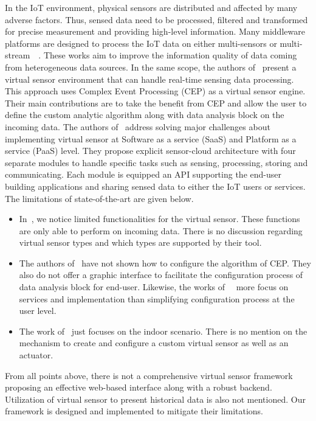 In the IoT environment, physical sensors are distributed and affected by many adverse factors. Thus, sensed data need to be processed, filtered and transformed for precise measurement and providing high-level information. Many middleware platforms are designed to process the IoT data on either multi-sensors or multi-stream~\cite{Julien2014}~\cite{LHuFWangJZhouK2015}. These works aim to improve the information quality of data coming from heterogeneous data sources. In the same scope, the authors of~\cite{BrunelliGalloBenini2016} present a virtual sensor environment that can handle real-time sensing data processing. This approach uses Complex Event Processing (CEP) as a virtual sensor engine. Their main contributions are to take the benefit from CEP and allow the user to define the custom analytic algorithm along with data analysis block on the incoming data. The authors of~\cite{GuptaMukherjee2016} address solving major challenges about implementing virtual sensor at Software as a service (SaaS) and Platform as a service (PaaS) level. They propose explicit sensor-cloud architecture with four separate modules to handle specific tasks such as sensing, processing, storing and communicating. Each module is equipped an API supporting the end-user building applications and sharing sensed data to either the IoT users or services.\\

The limitations of state-of-the-art are given below.
\begin{itemize}
    \item In~\cite{al2013}, we notice limited functionalities for the virtual sensor. These functions are only able to perform on incoming data. There is no discussion regarding virtual sensor types and which types are supported by their tool.
    \item The authors of~\cite{JeongJooHongShinLee2015} have not shown how to configure the algorithm of CEP. They also do not offer a graphic interface to facilitate the configuration process of data analysis block for end-user. Likewise, the works of~\cite{Julien2014}~\cite{LHuFWangJZhouK2015} more focus on services and implementation than simplifying configuration process at the user level.
    \item The work of~\cite{BrunelliGalloBenini2016} just focuses on the indoor scenario. There is no mention on the mechanism to create and configure a custom virtual sensor as well as an actuator.
\end{itemize}
From all points above, there is not a comprehensive virtual sensor framework proposing an effective web-based interface along with a robust backend. Utilization of virtual sensor to present historical data is also not mentioned. Our framework is designed and implemented to mitigate their limitations.


